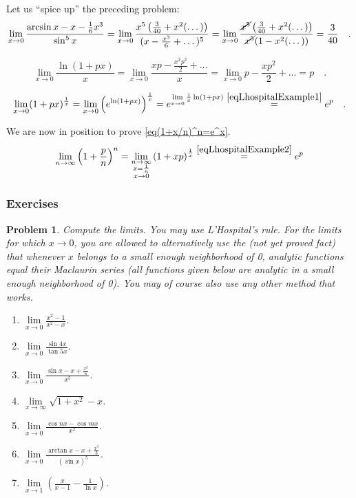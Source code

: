 \documentclass[12pt]{book}
\newtheorem{problem}[theorem]{Problem}
\begin{document}
Let us ``spice up'' the preceding problem:
\[
\lim\limits_{x\to 0} \frac{\arcsin x- x- \frac{1}6x^3}{\sin^{5} x}= \lim\limits_{x\to 0} \frac{x^5 \left(\frac{3}{40}+x^2(\dots)\right)}{(x-\frac{x^3}6+\dots)^5}=  \lim\limits_{x\to 0} \frac{\cancel{x^5} \left(\frac{3}{40}+x^2(\dots)\right)}{\cancel{x^5}(1-x^2(\dots))}= \frac{3}{40}\quad .
\]

\begin{equation}\label{eqLhospitalExample1}
\lim\limits_{x\to 0}\frac{\ln(1+px)}{x}=\lim \limits_{x\to 0} \frac{xp- \frac{x^2p^2}{2}+\dots  }{x}= \lim \limits_{x\to 0} p- \frac{xp^2}{2}+\dots = p\quad .
\end{equation}

\begin{equation}\label{eqLhospitalExample2}
\lim\limits_{x\to 0}(1+px)^{\frac1x}= \lim\limits_{x\to 0} \left(e^{\ln (1+px)}\right)^{\frac1x} = e^{\lim\limits_{x\to 0}\frac{1}x\ln (1+px)} \stackrel{\eqref{eqLhospitalExample1}}{=}e^{p}\quad .
\end{equation}

We are now in position to prove \eqref{eq(1+x/n)^n=e^x}.
\[
\lim\limits_{n\to \infty} \left(1+\frac{p}{n}\right)^n= \lim_{\substack{n\to \infty \\ x=\frac{1}{n}\\x\to 0}} \left(1+xp\right)^{\frac{1}{x}} \stackrel{\eqref{eqLhospitalExample2}}{=}e^p
\]
\subsubsection{Exercises}
\begin{problem}
Compute the limits. You may use L'Hospital's rule. For the limits for which $x\to 0$, you are allowed to alternatively use the (not yet proved fact) that whenever $x$ belongs to a small enough neighborhood of 0, analytic functions equal their Maclaurin series (all functions given below are analytic in a small enough neighborhood of 0). You may of course also use any other method that works.
\begin{enumerate}
\item $\lim\limits_{x\to 0} \frac{x^2-1}{x^2-x}$.
\item $\lim\limits_{x\to 0} \frac{\sin 4 x}{\tan 5x}$.
\item $\lim\limits_{x\to 0} \frac{\sin x - x +\frac{x^3}{6}}{x^5}$.
\item $\lim\limits_{x\to \infty} \sqrt{1+x^2} - x$.
\item $\lim\limits_{x\to 0} \frac{\cos n x - \cos mx }{x^2}$.
\item $\lim\limits_{x\to 0} \frac{\arctan x - x+ \frac{x^3}{3} }{(\sin x)^5}$.
\item $\lim\limits_{x\to 1}\left(\frac{x}{x-1}- \frac{1}{\ln x} \right)$.
\end{enumerate}
\end{problem}
\end{document}
